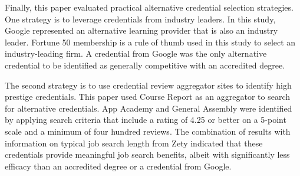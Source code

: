 \documentclass[review]{elsarticle}
\begin{document}

Finally, this paper evaluated practical alternative credential selection strategies.
One strategy is to leverage credentials from industry leaders.
In this study, Google represented an alternative learning provider that is also an industry leader.
Fortune 50 membership is a rule of thumb used in this study to select an industry-leading firm.
A credential from Google was the only alternative credential to be identified as generally competitive with an accredited degree.

The second strategy is to use credential review aggregator sites to identify high prestige credentials.
This paper used Course Report as an aggregator to search for alternative credentials.
App Academy and General Assembly were identified by applying search criteria that include a rating of 4.25 or better on a 5-point scale and a minimum of four hundred reviews.
The combination of results with information on typical job search length from Zety indicated
that these credentials provide meaningful job search benefits,
albeit with significantly less efficacy than an accredited degree or a credential from Google.


\end{document}
